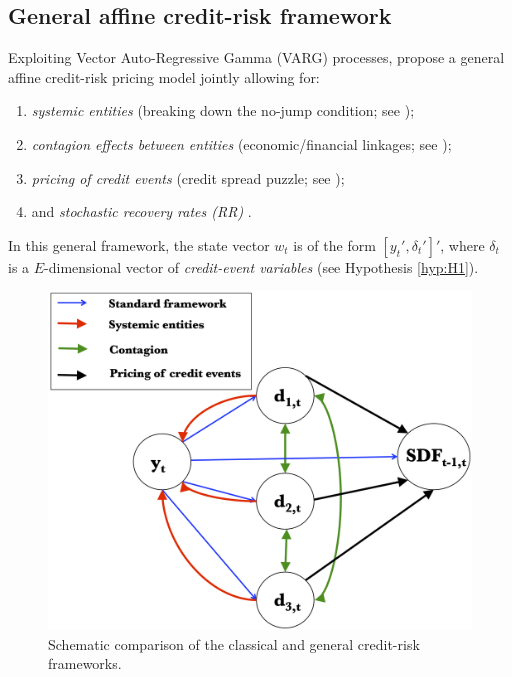\documentclass[
  12pt,
]{book}
\providecommand{\tightlist}{%
  \setlength{\itemsep}{0pt}\setlength{\parskip}{0pt}}
\theoremstyle{definition}
\theoremstyle{definition}
\theoremstyle{definition}
\theoremstyle{definition}
\theoremstyle{remark}
\begin{document}
\hypertarget{CreditGeneral}{%
\subsection{General affine credit-risk framework}\label{CreditGeneral}}

Exploiting Vector Auto-Regressive Gamma (VARG) processes, \citet{Monfort_Pegoraro_Renne_Roussellet_2021} propose a general affine credit-risk pricing model jointly allowing for:

\begin{enumerate}
\def\labelenumi{\arabic{enumi}.}
\tightlist
\item
  \emph{systemic entities} (breaking down the no-jump condition; see \citet{CollinDufresne_Goldstein_Hugonnier_2004});
\item
  \emph{contagion effects between entities} (economic/financial linkages; see \citet{AITSAHALIA2014151});
\item
  \emph{pricing of credit events} (credit spread puzzle; see \citet{Gourieroux_Monfort_Renne_2014});
\item
  and \emph{stochastic recovery rates (RR)} \citep{Altman_Brady_Resti_Sironi_2005}.
\end{enumerate}

In this general framework, the state vector \(w_t\) is of the form \([y_t',\delta_t']'\), where \(\delta_t\) is a \(E\)-dimensional vector of \emph{credit-event variables} (see Hypothesis \ref{hyp:H1}).

\begin{figure}

{\centering \includegraphics[width=0.8\linewidth]{figures/Schema2} 

}

\caption{Schematic comparison of the classical and general credit-risk frameworks.}\label{fig:Genemework}
\end{figure}
\end{document}
